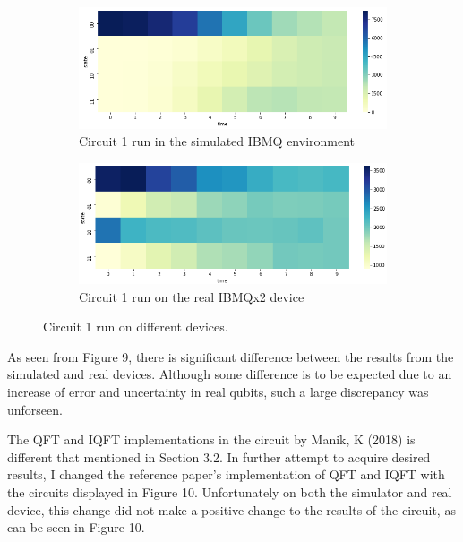\documentclass{article}
\begin{document}
\begin{figure}
\centering
\begin{subfigure}{.5\textwidth}
  \centering
  \includegraphics[width=0.9\linewidth]{../images/circ1_heatmap_sim}
  \caption{Circuit 1 run in the simulated IBMQ environment}
  \label{fig:sub1}
\end{subfigure}%
\begin{subfigure}{.5\textwidth}
  \centering
  \includegraphics[width=0.9\linewidth]{../images/circ1_heatmap_real}
  \caption{Circuit 1 run on the real IBMQx2 device}
  \label{fig:sub2}
\end{subfigure}
\caption{Circuit 1 run on different devices.}
\label{fig:test}
\end{figure}

As seen from Figure 9, there is significant difference between the results from the simulated and real devices. Although some difference is to be expected due to an increase of error and uncertainty in real qubits, such a large discrepancy was unforseen. 

The QFT and IQFT implementations in the circuit by Manik, K (2018) \cite{manik} is different that mentioned in Section 3.2. In further attempt to acquire desired results, I changed the reference paper's implementation of QFT and IQFT with the circuits displayed in Figure 10. Unfortunately on both the simulator and real device, this change did not make a positive change to the results of the circuit, as can be seen in Figure 10.
\end{document}
